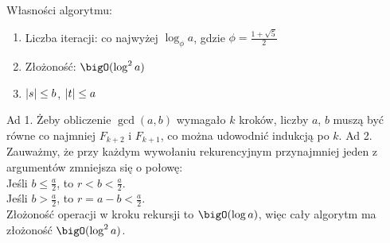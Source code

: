 Własności algorytmu:
\begin{enumerate}
    \item Liczba iteracji: co najwyżej \( \log_{\phi} a \), gdzie \( \phi = \frac{1 + \sqrt{5}}{2} \)
    \item Złożoność: \( \bigO(\log^2 a) \)
    \item \( \left\lvert s\right\rvert \leq b \), \( \left\lvert t\right\rvert \leq a \)
\end{enumerate}
Ad 1. Żeby obliczenie \( \gcd(a, b) \) wymagało \( k \) kroków, liczby \( a \), \( b \) muszą być równe co najmniej \( F_{k+2} \) i \( F_{k+1} \), co można udowodnić indukcją po \( k \).
Ad 2. Zauważmy, że przy każdym wywołaniu rekurencyjnym przynajmniej jeden z argumentów zmniejsza się o połowę: \\
Jeśli \( b \leq \frac{a}{2} \), to \( r < b < \frac{a}{2} \). \\
Jeśli \( b > \frac{a}{2} \), to \( r = a - b < \frac{a}{2} \). \\
Złożoność operacji w kroku rekursji  to \( \bigO(\log a) \), więc cały algorytm ma złożoność \( \bigO(\log^2 a) \).